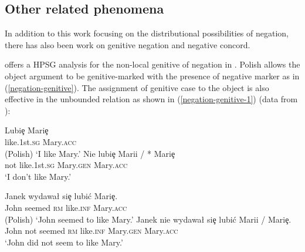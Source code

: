 \documentclass[output=paper
                ,modfonts
                ,nonflat
	        ,collection
	        ,collectionchapter
	        ,collectiontoclongg
 	        ,biblatex
                ,babelshorthands
                ,newtxmath
                ,draftmode
                ,colorlinks, citecolor=brown
]{./langsci/langscibook}
\begin{document}
{\begin{exe}
\begin{xlist}
\iffalse{
The VSO language Welsh also employs a preverbal
negative, as illustrated by \citet{BJ:00}:

\ea
\ex \label{negation-NC-1a}
\gll Ni chaf sefyll yma \\
     \textsc{neg} can stand here\\
\glt `I can't stand here.'
\z
%
As given in (\ref{negation-NC-1a}), Welsh allows the preverbal
particle \type{ni} to occur in the preverbal position.
%
With treating the negative particle to form a negative word
with the following stem, \citet{BJ:00} offer a selectional
analysis of negation.
That is, the finite negative verb selects
two complements (e.g., subject and object) while
the nonfinite negative verb selects a VP.}\fi

\section{Other related phenomena}

In addition to this work focusing on the distributional possibilities
 of negation, there has also been work on genitive negation and negative concord.

 \citet{Prz:00} offers a HPSG analysis for the non-local genitive of negation in .
 Polish allows the object argument to be genitive-marked with the presence of negative marker as in (\ref{negation-genitive}).
  The assignment of genitive case to the object is also effective in
  the unbounded relation as shown in (\ref{negation-genitive-1}) (data from \citealt[]{Prz:00}):

\eal
\ex  \label{negation-genitive}
\gll Lubi\c{e} Mari\c{e} \\
     like.1st.\textsc{sg} Mary.\textsc{acc}\\\hfill(Polish)
\glt `I like Mary.'
\ex
\gll Nie lubi\c{e} Marii / * Mari\c{e} \\
     not like.1st.\textsc{sg} Mary.\textsc{gen} {} {} Mary.\textsc{acc}\\
\glt `I don't like Mary.'
\zl

\eal
\ex \label{negation-genitive-1}
\gll  Janek wydawa\l{} si\c{e} lubi\'{c} Mari\c{e}.\\
      John seemed \textsc{rm}     like.\textsc{inf} Mary.\textsc{acc}\\\hfill(Polish)
\glt `John seemed to like Mary.'
\ex
\gll  Janek nie wydawa\l{} si\c{e} lubi\'{c} Marii / Mari\c{e}.\\
      John not seemed \textsc{rm} like.\textsc{inf}      Mary.\textsc{gen} {} Mary.\textsc{acc}\\
\glt `John did not seem to like Mary.'
\zl


\end{xlist}
\end{exe}}
\end{document}

